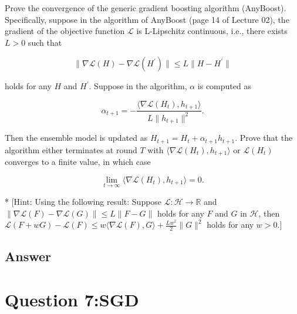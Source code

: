 \documentclass[
	12pt, %
]{fphw}
\begin{document}
\begin{problem}
	Prove the convergence of the generic gradient boosting algorithm (AnyBoost). Specifically, suppose in the algorithm of AnyBoost (page 14 of Lecture 02), the gradient of the objective function $\mathcal{L}$ is L-Lipschitz continuous, i.e., there exists $L>0$ such that

$$
\|\nabla\mathcal{L}(H)-\nabla\mathcal{L}(H^{\prime})\|\leq L\|H-H^{\prime}\|
$$

holds for any $H$ and $H^{\prime}$. Suppose in the algorithm, $\alpha$ is computed as

$$
\alpha_{t+1}=-\frac{\langle\nabla\mathcal{L}(H_{t}),h_{t+1}\rangle}{L\|h_{t+1}\|^{2}}.
$$

Then the ensemble model is updated as $H_{t+1}=H_t+\alpha_{t+1}h_{t+1}.$ Prove that the algorithm either terminates at round $T$ with $\langle\nabla\mathcal{L}(H_t),h_{t+1}\rangle$ or $\mathcal{L}(H_t)$ converges to a finite value, in which case

$$
\operatorname*{lim}_{t\to\infty}\langle\nabla\mathcal{L}(H_{t}),h_{t+1}\rangle=0.
$$

* [Hint: Using the following result: Suppose $\mathcal{L} : \mathcal{H} \to \mathbb{R} $ and $\|\nabla\mathcal{L} ( F) - \nabla\mathcal{L} ( G) \|\leq L\|F- G\|$ holds for any $F$ and $G$ in $\mathcal{H} $, then $\mathcal{L}(F+wG)-\mathcal{L}(F)\leq w\langle\nabla\mathcal{L}(F),G\rangle+\frac{Lw^2}2\|G\|^2$ holds for any $w>0.]$

\end{problem}
\subsection*{Answer}

\section*{Question 7:SGD}
\end{document}
